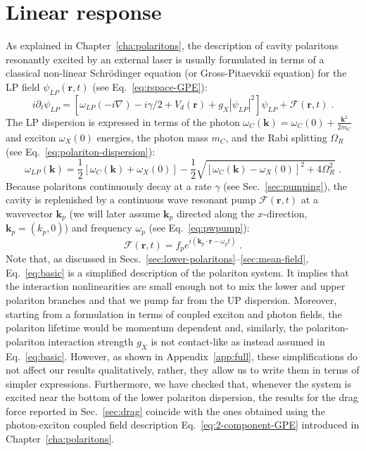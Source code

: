 \section{Linear response}
\label{sec:linea}

As explained in Chapter~\ref{cha:polaritons}, the description of
cavity polaritons resonantly excited by an external laser is usually
formulated in terms of a classical non-linear Schr\"odinger equation
(or Gross-Pitaevskii equation) for the LP field $\psi_{LP}(\bm{r}, t)$
(see Eq.~\eqref{eq:rspace-GPE}):
%
\begin{equation}
  i \partial_t \psi_{LP} = [\omega_{LP}(-i\nabla) - i\gamma/2 +
    V_d(\bm{r}) + g_X |\psi_{LP}|^2]\psi_{LP} + \mathcal{F}(\bm{r},t)\; .
\label{eq:basic}
\end{equation}
%
The LP dispersion is expressed in terms of the photon
$\omega_C(\bm{k}) = \omega_C(0) + \frac{\bm{k}^2}{2m_C}$ and exciton
$\omega_X(0)$ energies, the photon mass $m_C$, and the Rabi splitting
$\Omega_R$ (see Eq.~\eqref{eq:polariton-dispersion}):
%
\begin{equation}
  \omega_{LP}(\bm{k}) = \frac{1}{2} \left[\omega_C(\bm{k}) +
    \omega_X(0)\right]  - \frac{1}{2} \sqrt{\left[\omega_C(\bm{k}) -
    \omega_X(0) \right]^2 + 4\Omega_R^2} \; .
\label{eq:dispe}
\end{equation}
%
Because polaritons continuously decay at a rate $\gamma$ (see
Sec.~\ref{sec:pumping}), the cavity is replenished by a continuous
wave resonant pump $\mathcal{F}(\bm{r},t)$ at a wavevector $\bm{k}_p$ (we will
later assume $\bm{k}_p$ directed along the $x$-direction,
$\bm{k}_p = (k_p,0)$) and frequency $\omega_p$ (see
Eq.~\eqref{eq:pwpump}):
\begin{equation}
  \mathcal{F}(\bm{r},t) = f_p e^{i (\bm{k}_p \cdot \bm{r} -
    \omega_p t)} \; .
\end{equation}
%
Note that, as discussed in
Secs.~\ref{sec:lower-polaritons}--\ref{sec:mean-field},
Eq.~\eqref{eq:basic} is a simplified description of the polariton
system. It implies that the interaction nonlinearities are small
enough not to mix the lower and upper polariton branches and that we
pump far from the UP dispersion. Moreover, starting from a formulation
in terms of coupled exciton and photon fields, the polariton lifetime
would be momentum dependent and, similarly, the polariton-polariton
interaction strength $g_X$ is not contact-like as instead assumed in
Eq.~\eqref{eq:basic}. However, as shown in Appendix~\ref{app:full},
these simplifications do not affect our results qualitatively, rather,
they allow us to write them in terms of simpler
expressions. Furthermore, we have checked that, whenever the system is
excited near the bottom of the lower polariton dispersion, the results
for the drag force reported in Sec.~\ref{sec:drag} coincide with the
ones obtained using the photon-exciton coupled field description
Eq.~\eqref{eq:2-component-GPE} introduced in
Chapter~\ref{cha:polaritons}.

